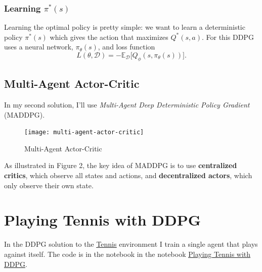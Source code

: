 \documentclass[sigchi]{acmart}
\begin{document}
\subsubsection{Learning $\pi^*(s)$}

Learning the optimal policy is pretty simple: we want to learn a deterministic policy $\pi^*(s)$ which gives the action that maximizes $Q^*(s, a)$.
For this DDPG uses a neural network, $\pi_\theta(s)$, and loss function
$$L(\theta, \mathcal{D}) = -\mathbb{E}_{\mathcal{D}}\big[Q_\phi(s,\pi_\theta(s))\big].$$
 
\subsection{Multi-Agent Actor-Critic}

In my second solution, I'll use {\em Multi-Agent Deep Deterministic Policy Gradient}~\cite{DBLP:journals/corr/LoweWTHAM17} (MADDPG).  

\begin{figure}[h]
	\centering
	\texttt{[image: multi-agent-actor-critic]}
	\label{fig:ma-ac}
	\caption{Multi-Agent Actor-Critic~\cite{DBLP:journals/corr/LoweWTHAM17}}
\end{figure}

As illustrated in Figure 2, the key idea of MADDPG is to use \textbf{centralized critics}, which observe all states and actions, and 
 \textbf{decentralized actors}, which only observe their own state.
 

\section{Playing Tennis with DDPG}

In the DDPG solution to the 
\href{https://github.com/Unity-Technologies/ml-agents/blob/master/docs/Learning-Environment-Examples.md#tennis}{\underline{Tennis}}
environment I train a single agent that plays against itself. The code is in the notebook
in the notebook 
\href{https://nbviewer.jupyter.org/github/bobflagg/Collaboration-and-Competition/blob/master/01-Playing-Tennis-with-DDPG.ipynb}{\underline{Playing Tennis with DDPG}}.
\end{document}
